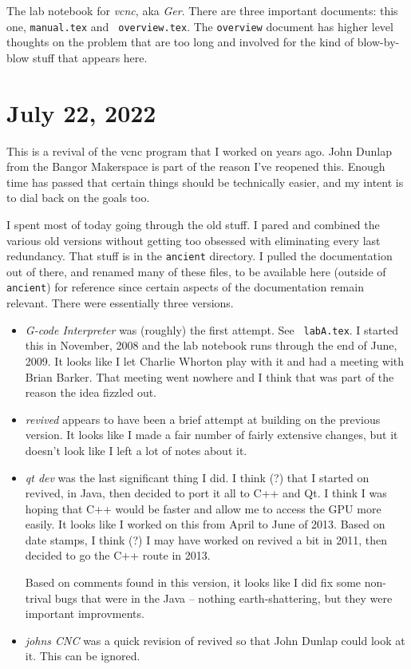 \documentclass{article}
\begin{document}
\raggedbottom

\newcommand{\mymargin}[1]{\marginpar{\rm\tiny #1}}
\newcommand{\leftmar}[1]{\reversemarginpar \mymargin{#1}}

\noindent The lab notebook for \emph{vcnc}, aka \emph{Ger}. There are
three important documents: this one, {\tt manual.tex} and {\tt
  overview.tex}. The {\tt overview} document has higher level thoughts
on the problem that are too long and involved for the kind of
blow-by-blow stuff that appears here.

\section{July 22, 2022}

This is a revival of the vcnc program that I worked on years ago. John
Dunlap from the Bangor Makerspace is part of the reason I've reopened
this. Enough time has passed that certain things should be technically
easier, and my intent is to dial back on the goals too.

I spent most of today going through the old stuff. I pared and
combined the various old versions without getting too obsessed with
eliminating every last redundancy. That stuff is in the {\tt ancient}
directory. I pulled the documentation out of there, and
renamed many of these files, to be available here (outside of {\tt
  ancient}) for reference since certain aspects of the documentation
remain relevant. There were essentially three versions.

\begin{itemize}[itemsep = -3pt,leftmargin=*]
\item \emph{G-code Interpreter} was (roughly) the first attempt. See {\tt
  labA.tex}. I started this in November, 2008 and the lab notebook
  runs through the end of June, 2009. It looks like I let Charlie
  Whorton play with it and had a meeting with Brian Barker. That
  meeting went nowhere and I think that was part of the reason the
  idea fizzled out.
\item \emph{revived} appears to have been a brief attempt at building on
  the previous version. It looks like I made a fair number of fairly
  extensive changes, but it doesn't look like I left a lot of notes
  about it.
\item \emph{qt dev} was the last significant thing I did. I think (?)
  that I started on revived, in Java, then decided to port it
  all to C++ and Qt. I think I was hoping that C++ would be faster and
  allow me to access the GPU more easily. It looks like I worked on
  this from April to June of 2013. Based on date stamps, I think (?) I
  may have worked on revived a bit in 2011, then decided to go the
  C++ route in 2013.

  Based on comments found in this version, it looks like I did fix
  some non-trival bugs that were in the Java -- nothing
  earth-shattering, but they were important improvments.
\item \emph{johns CNC} was a quick revision of revived so that John
  Dunlap could look at it. This can be ignored.
\end{itemize}
\end{document}
